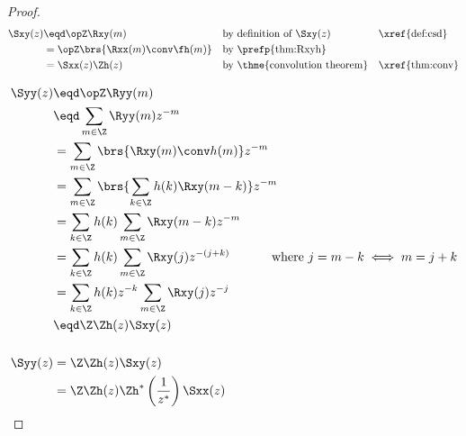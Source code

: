 \begin{proof}
\begin{align*}
  \Sxy(z)
     &\eqd \opZ \Rxy(m)
    && \text{by definition of $\Sxy(z)$}
    && \text{\xref{def:csd}}
   \\&= \opZ \brs{\Rxx(m) \conv \fh(m)}
    && \text{by \prefp{thm:Rxyh}}
   \\&= \Sxx(z)  \Zh(z)
    && \text{by \thme{convolution theorem}}
    && \text{\xref{thm:conv}}
\end{align*}

\begin{align*}
   \Syy(z)
     &\eqd \opZ \Ryy(m)
   \\&\eqd \sum_{m\in\Z}\Ryy(m) z^{-m}
   \\&=    \sum_{m\in\Z}\brs{ \Rxy(m) \conv h(m) } z^{-m}
   \\&=    \sum_{m\in\Z}\brs{ \sum_{k\in\Z}h(k) \Rxy(m-k)  } z^{-m}
   \\&=    \sum_{k\in\Z}h(k) \sum_{m\in\Z}\Rxy(m-k) z^{-m}
   \\&=    \sum_{k\in\Z}h(k) \sum_{m\in\Z}\Rxy(j) z^{-(j+k)}
           \hspace{3em}\mbox{ where $j=m-k\iff m=j+k$}
   \\&=    \sum_{k\in\Z}h(k)z^{-k}   \sum_{m\in\Z}\Rxy(j) z^{-j}
   \\&\eqd \Z\Zh(z) \Sxy(z)
\\
\\
   \Syy(z)
     &= \Z\Zh(z) \Sxy(z)
   \\&= \Z\Zh(z) \Zh^\ast\left(\frac{1}{z^\ast}\right) \Sxx(z)
\end{align*}
\end{proof}

